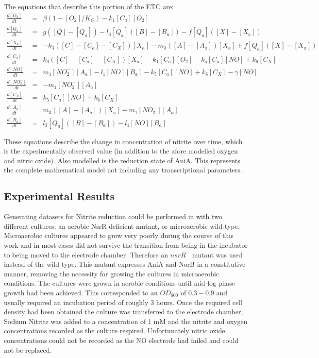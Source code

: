 \noindent The equations that describe this portion of the ETC are:
\begin{eqnarray*}
\frac{d[O_2]}{dt} & = & \beta(1-[O_2]/K_O) - k_{1}[C_a][O_2]\\
\frac{d[Q_a]}{dt} & = & g([Q] - [Q_a]) - l_3[Q_a]([B] - [B_a]) - f[Q_a]([X]-[X_a])\\
\frac{d[X_a]}{dt} & = & -k_3([C] - [C_a] - [C_X])[X_a]  - m_3([A] - [A_a])[X_a] + f[Q_a]([X]-[X_a])\\
\frac{d[C_a]}{dt} & = & k_3([C] - [C_a] - [C_X])[X_a] - k_{1}[C_a][O_2] - k_5[C_a][NO] + k_6[C_X]\\
\frac{d[NO]}{dt} & = & m_{1}[NO_2^-][A_a] - l_1[NO][B_a] - k_5[C_a][NO] + k_6 [C_X] - \gamma[NO]\\
\frac{d[NO_2^-]}{dt} & = & - m_{1}[NO_2^-][A_a]\\
\frac{d[C_X]}{dt} & = & k_5[C_a][NO] - k_6 [C_X]\\
\frac{d[A_a]}{dt} & = & m_3([A] - [A_a])[X_a]- m_{1}[NO_2^-][A_a]\\
\frac{d[B_a]}{dt} & = & l_3[Q_a]([B] - [B_a]) - l_1[NO][B_a]
\end{eqnarray*}

These equations describe the change in concentration of nitrite over time, which is the experimentally observed value (in addition to the afore modelled oxygen and nitric oxide). Also modelled is the reduction state of AniA. This represents the complete mathematical model not including any transcriptional parameters.

\subsection{Experimental Results}
Generating datasets for Nitrite reduction could be performed in with two different cultures; an aerobic NsrR deficient mutant, or microaerobic wild-type. Microaerobic cultures appeared to grow very poorly during the course of this work and in most cases did not survive the transition from being in the incubator to being moved to the electrode chamber. Therefore an $nsrR^-$ mutant was used instead of the wild-type. This mutant expresses AniA and NorB in a constitutive manner, removing the necessity for growing the cultures in microaerobic conditions. The cultures were grown in aerobic conditions until mid-log phase growth had been achieved. This corresponded to an $OD_{600}$ of $0.3-0.9$ and usually required an incubation period of roughly 3 hours. Once the required cell density had been obtained the culture was transferred to the electrode chamber, Sodium Nitrite was added to a concentration of 1 mM and the nitrite and oxygen concentrations recorded as the culture respired. Unfortunately nitric oxide concentrations could not be recorded as the NO electrode had failed and could not be replaced.

